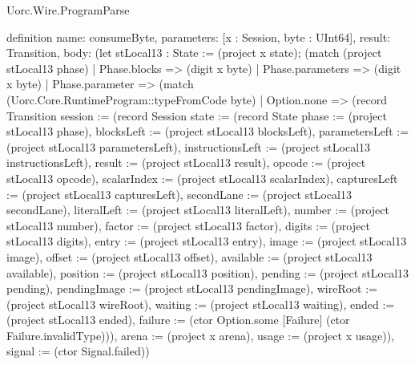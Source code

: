 \begin{lexlean}{Uorc.Wire.ProgramParse}
\begin{semanticmodule}
definition{
  name: consumeByte,
  parameters: [x : Session, byte : UInt64],
  result: Transition,
  body: (let stLocal13 : State := (project x state); (match (project stLocal13 phase)
    | Phase.blocks => (digit x byte)
    | Phase.parameters => (digit x byte)
    | Phase.parameter => (match (Uorc.Core.RuntimeProgram::typeFromCode byte)
      | Option.none => (record Transition {session := (record Session {state := (record State {phase := (project stLocal13 phase), blocksLeft := (project stLocal13 blocksLeft), parametersLeft := (project stLocal13 parametersLeft), instructionsLeft := (project stLocal13 instructionsLeft), result := (project stLocal13 result), opcode := (project stLocal13 opcode), scalarIndex := (project stLocal13 scalarIndex), capturesLeft := (project stLocal13 capturesLeft), secondLane := (project stLocal13 secondLane), literalLeft := (project stLocal13 literalLeft), number := (project stLocal13 number), factor := (project stLocal13 factor), digits := (project stLocal13 digits), entry := (project stLocal13 entry), image := (project stLocal13 image), offset := (project stLocal13 offset), available := (project stLocal13 available), position := (project stLocal13 position), pending := (project stLocal13 pending), pendingImage := (project stLocal13 pendingImage), wireRoot := (project stLocal13 wireRoot), waiting := (project stLocal13 waiting), ended := (project stLocal13 ended), failure := (ctor Option.some [Failure] (ctor Failure.invalidType))}), arena := (project x arena), usage := (project x usage)}), signal := (ctor Signal.failed)})
}
\end{semanticmodule}
\end{lexlean}
